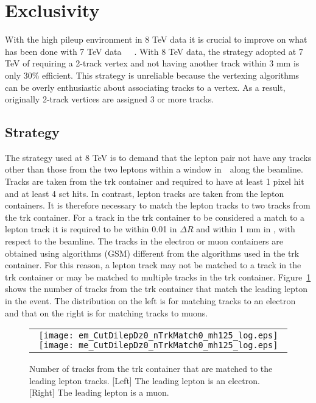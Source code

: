 \clearpage
\section{Exclusivity }
\label{sec:exclusivity}

\par With the high pileup environment in 8 TeV data it is crucial to improve
on what has been done with 7 TeV data~\cite{CMSmumu}~\cite{CMSee}~\cite{MonteNote}.
With 8 TeV data, the strategy adopted at 7 TeV of requiring a 2-track vertex
and not having another track within 3 mm is only 30\% efficient. This strategy 
 is unreliable because the vertexing algorithms can be overly enthusiastic about 
associating tracks to a vertex. As a result, originally 2-track
vertices are assigned 3 or more tracks.   

\subsection{Strategy}
\par The strategy used at 8 TeV is to demand that the lepton pair not have any tracks
other than those from the two leptons within a window in~\ along 
the beamline. Tracks are taken from the trk container and required to have 
at least 1 pixel hit and at least 4 sct hits. In contrast, lepton tracks are taken 
from the lepton containers. It is therefore necessary to match the lepton tracks to two tracks from the trk container.
For a track in the trk container to be considered a match to a lepton track it is required to
be within 0.01 in $\Delta R$ and within 1 mm  in , with respect to 
the beamline. The tracks in the electron or muon
containers are obtained using algorithms (GSM) different from the algorithms
used in the trk container. For this reason, a lepton track may not be matched to a track in the trk container
or may be matched to multiple tracks in the trk container. Figure~\ref{fig:trackMatching} 
shows the number of tracks from the trk container that match the leading lepton 
in the event. The distribution on the left is for matching tracks to an electron and 
that on the right is for matching tracks to muons. 
 
\begin{figure}[!h]
\centering
\begin{tabular}{c}
	\texttt{[image: em\_CutDilepDz0\_nTrkMatch0\_mh125\_log.eps]}
	\texttt{[image: me\_CutDilepDz0\_nTrkMatch0\_mh125\_log.eps]}\\
\end{tabular}
\caption{Number of tracks from the trk container that are matched to the leading 
lepton tracks. [Left] The leading lepton is an electron. [Right] The leading lepton 
is a muon.}
\label{fig:trackMatching}
\end{figure}

